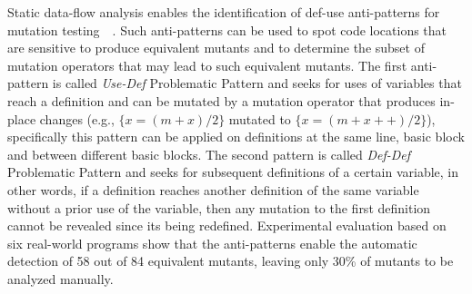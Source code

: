 Static data-flow analysis enables the identification of def-use anti-patterns for mutation testing~~\cite{kintis2014using,kintis2015medic}.
Such anti-patterns can be used to spot code locations that are sensitive to produce equivalent mutants 
and to determine the subset of mutation operators that may lead to such equivalent mutants.
The first anti-pattern is called \textit{Use-Def} Problematic Pattern and seeks for uses of variables that reach a definition and can be mutated by a mutation operator that produces in-place changes (e.g., $\{x = (m + x)/2\}$ mutated to $\{x = (m + x++)/2\}$), specifically this pattern can be applied on definitions at the same line, basic block and between different basic blocks. 
The second pattern is called \textit{Def-Def} Problematic Pattern and seeks for subsequent definitions of a certain variable, in other words, if a definition reaches another definition of the same variable without a prior use of the variable, then any mutation to the first definition cannot be revealed since its being redefined. 
Experimental evaluation based on six real-world programs show that the anti-patterns enable the automatic detection of 58 out of 84 equivalent mutants, leaving only 30\% of mutants to be analyzed manually.

